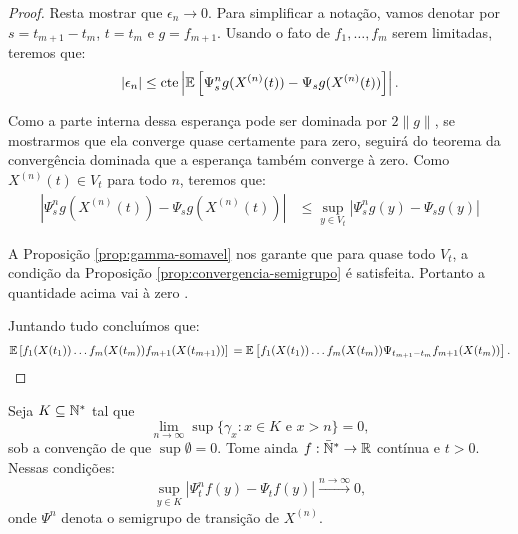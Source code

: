\begin{proof}
  Resta mostrar que $\epsilon_n \to 0$. Para simplificar a notação,
  vamos denotar por $s = t_{m+1} - t_m$, $t = t_m$ e $g = f_{m+1}$.
  Usando o fato de $f_1, \ldots, f_m$ serem limitadas, teremos que:
  \begin{displaymath}
    |\epsilon_n| \leq  \textrm{cte}
    \left\lvert {\mathbb{E}} \left[
        \Psi_{s}^n g (X^{(n)}(t)) -
        \Psi_{s} g (X^{(n)}(t))
      \right]
    \right\rvert.
  \end{displaymath}

  Como a parte interna dessa esperança pode ser dominada por $2\lVert
  g \rVert$, se mostrarmos que ela converge quase certamente para
  zero, seguirá do teorema da convergência dominada que a esperança também
  converge à zero. Como $X^{(n)}(t) \in V_t$ para todo $n$, teremos
  que:
  \begin{align*}
    \left\lvert \Psi_{s}^n g (X^{(n)}(t)) - \Psi_{s} g (X^{(n)}(t))
    \right\rvert
    &\leq \sup_{y \in V_t}  \left\lvert \Psi_{s}^n g (y) - \Psi_{s} g (y)
    \right\rvert
  \end{align*}

  A Proposição \ref{prop:gamma-somavel} nos garante que para quase
  todo $V_t$, a condição da Proposição
  \ref{prop:convergencia-semigrupo} é satisfeita. Portanto a
  quantidade acima vai à zero \qc.

  Juntando tudo concluímos que:
  \begin{displaymath}
    {\mathbb{E}} \left[
      f_{1}(X(t_{1})) 
      \ldots
      f_{m}(X(t_{m})) 
      f_{m+1}(X(t_{m+1})) 
    \right] \notag\\
    = {\mathbb{E}} \left[
      f_{1}(X(t_{1})) 
      \ldots
      f_{m}(X(t_{m})) 
      \Psi_{t_{m+1} - t_{m}} f_{m+1} (X(t_{m})) 
    \right].
  \end{displaymath}
\end{proof}


\begin{proposicao}
  \label{prop:convergencia-semigrupo}
  Seja $K \subseteq {\mathbb{N^*}}$ tal que
  \begin{displaymath}
    \lim_{n \to \infty} \sup\{ \gamma_x: x \in  K \textrm{ e } x > n\} = 0,
  \end{displaymath}
  sob a convenção de que $\sup \emptyset = 0$. Tome ainda $f: {\mathbb{\bar{N}^*}}
  \to {\mathbb{R}}$ contínua e $t > 0$. Nessas condições:
  \begin{equation}
    \label{eq:convergencia-semigrupo}
    \sup_{y \in K} | \Psi^n_t f (y) - \Psi_t f(y) |
    \xrightarrow{n\to\infty} 0,
  \end{equation}
  onde $\Psi^n$ denota o semigrupo de transição de $X^{(n)}$.
\end{proposicao}

